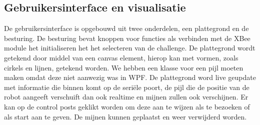 \documentclass{report}
\begin{document}
\subsection{Gebruikersinterface en visualisatie}
De gebruikersinterface is opgebouwd uit twee onderdelen, een plattegrond en de besturing.
De besturing bevat knoppen voor functies als verbinden met de XBee module het initialiseren het het selecteren van de challenge.
De plattegrond wordt getekend door middel van een canvas element, hierop kan met vormen, zoals cirkels en lijnen, getekend worden. We hebben een klasse voor een pijl moeten maken omdat deze niet aanwezig was in WPF.
De plattegrond word live geupdate met informatie die binnen komt op de seriële poort, de pijl die de positie van de robot aangeeft verschuift dan ook realtime en mijnen zullen ook verschijnen.
Er kan op de control posts geklikt worden om deze aan te wijzen als te bezoeken of als start aan te geven.
De mijnen kunnen geplaatst en weer verwijderd worden.
\end{document}
